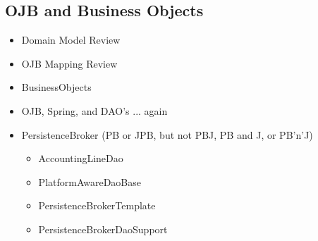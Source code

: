 \begin{ifhtml}
    \begin{s5slide}
        \section{OJB and Business Objects}
        \begin{itemize}
          \item Domain Model Review
          \item OJB Mapping Review
          \item BusinessObjects
          \item OJB, Spring, and DAO's ... again
          \item {}PersistenceBroker (PB or JPB, but not PBJ, PB and J, or PB'n'J)
            \begin{itemize}
              \item {}AccountingLineDao
              \item {}PlatformAwareDaoBase
              \item {}PersistenceBrokerTemplate
              \item {}PersistenceBrokerDaoSupport 
            \end{itemize}
        \end{itemize}
        \begin{s5notes}
        \end{s5notes}
    \end{s5slide}
    
    \begin{s5slide}

\end{s5slide}
\end{ifhtml}
